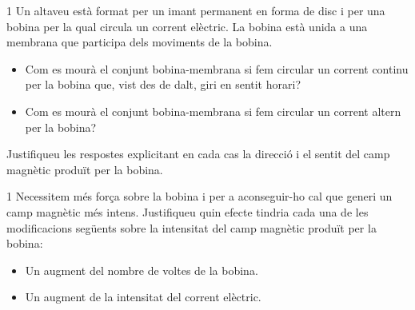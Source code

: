 \begin{apartat}{1}
Un altaveu està format per un imant permanent en forma de disc i per una bobina per la qual circula un corrent elèctric. La bobina està unida a una membrana que participa dels moviments de la bobina.


\begin{itemize}[label=---]
  \item Com es mourà el conjunt bobina-membrana si fem circular un corrent continu per la bobina que, vist des de dalt, giri en sentit horari? \aladreta{\textit{[0,5 punts]}}
  \item Com es mourà el conjunt bobina-membrana si fem circular un corrent altern per la bobina? \aladreta{\textit{[0,5 punts]}}
\end{itemize}
Justifiqueu les respostes explicitant en cada cas la direcció i el sentit del camp magnètic produït per la bobina.
\end{apartat}

\begin{apartat}{1}
Necessitem més força sobre la bobina i per a aconseguir-ho cal que generi un camp magnètic més intens. Justifiqueu quin efecte tindria cada una de les modificacions següents sobre la intensitat del camp magnètic produït per la bobina:
\begin{itemize}[label=---]
  \item Un augment del nombre de voltes de la bobina. \aladreta{\textit{[0,5 punts]}}
  \item Un augment de la intensitat del corrent elèctric. \aladreta{\textit{[0,5 punts]}}
\end{itemize}
\end{apartat}

